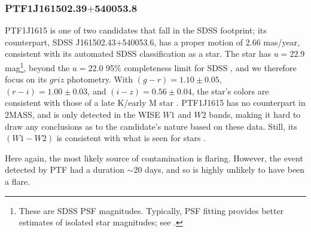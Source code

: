 \documentclass{emulateapj}
\begin{document}
\subsubsection*{PTF1J161502.39$+$540053.8} %
PTF1J1615 is one of two candidates that fall in the SDSS footprint; its counterpart, SDSS J161502.43$+$540053.6, has a proper motion of 2.66 mas/year, consistent with its automated SDSS classification as a star. The star has $u = 22.9$ mag\footnote{These are SDSS PSF magnitudes. Typically, PSF fitting provides better estimates of isolated star magnitudes; see \citet{stoughton02}.}, beyond the $u = 22.0$ 95\% completeness limit for SDSS \citep{stoughton02}, and we therefore focus on its $griz$ photometry. With $(g-r) = 1.10\pm0.05$, $(r-i) = 1.00\pm0.03$, and $(i-z) = 0.56\pm0.04$, the star's colors are consistent with those of a late K/early M star \citep{kev07}. PTF1J1615 has no counterpart in 2MASS, and is only detected in the WISE $W1$ and $W2$ bands, making it hard to draw any conclusions as to the candidate's nature based on these data. Still, its $(W1-W2)$ is consistent with what is seen for stars \citep[cf.\ Figure 14 in][]{yan2013}. 

Here again, the most likely source of contamination is flaring. However, the event detected by PTF had a duration $\sim$20 days, and so is highly unlikely to have been a flare. 
\end{document}
